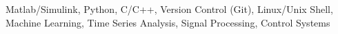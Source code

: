 \documentclass[10pt,a4paper]{article}
\begin{document}
\spacedhrule{0.1em}{-0.8em}
Matlab/Simulink, Python, C/C++, Version Control (Git), Linux/Unix Shell, Machine
Learning, Time Series Analysis, Signal Processing, Control Systems
  



\end{document}
